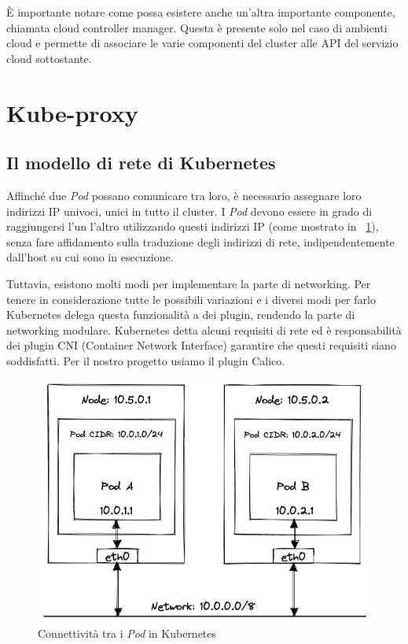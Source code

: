\documentclass[12pt, hidelinks]{report}
\begin{document}
È importante notare come possa esistere anche un'altra importante componente, chiamata cloud controller manager. Questa è presente solo nel caso di ambienti cloud e permette di associare le varie componenti del cluster alle API del servizio cloud sottostante.

\section{Kube-proxy}

\subsection{Il modello di rete di Kubernetes}
Affinché due \textit{Pod} possano comunicare tra loro, è necessario assegnare loro indirizzi IP univoci, unici in tutto il cluster. I \textit{Pod} devono essere in grado di raggiungersi l'un l'altro utilizzando questi indirizzi IP (come mostrato in \figurename~\ref{fig:kube_networking}), senza fare affidamento sulla traduzione degli indirizzi di rete, indipendentemente dall'host su cui sono in esecuzione.

Tuttavia, esistono molti modi per implementare la parte di networking. Per tenere in considerazione tutte le possibili variazioni e i diversi modi per farlo Kubernetes delega questa funzionalità a dei plugin, rendendo la parte di networking modulare. Kubernetes detta alcuni requisiti di rete ed è responsabilità dei plugin CNI (Container Network Interface) garantire che questi requisiti siano soddisfatti. Per il nostro progetto usiamo il plugin Calico.

\begin{figure}[H]
    \centering
    \includegraphics[width=\linewidth]{3-kube-networking.png}
    \caption{Connettività tra i \textit{Pod} in Kubernetes \cite{demystifying-kube-proxy}}
    \label{fig:kube_networking}
\end{figure}
\end{document}
